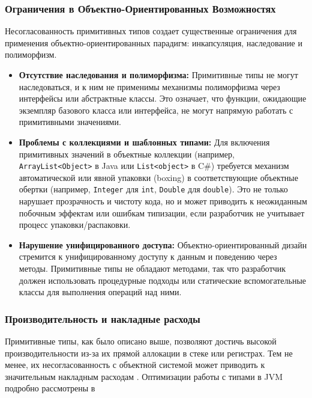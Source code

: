 \subsubsection*{Ограничения в Объектно-Ориентированных Возможностях}
Несогласованность примитивных типов создает существенные ограничения для применения объектно-ориентированных парадигм: инкапсуляция, наследование и полиморфизм.

\begin{itemize}
    \item \textbf{Отсутствие наследования и полиморфизма:} Примитивные типы не могут наследоваться, и к ним не применимы механизмы полиморфизма через интерфейсы или абстрактные классы. Это означает, что функции, ожидающие экземпляр базового класса или интерфейса, не могут напрямую работать с примитивными значениями.

    \item \textbf{Проблемы с коллекциями и шаблонных типами:} Для включения примитивных значений в объектные коллекции (например, \texttt{ArrayList<Object>} в Java или \texttt{List<object>} в C\#) требуется механизм автоматической или явной упаковки (boxing) в соответствующие объектные обертки (например, \texttt{Integer} для \texttt{int}, \texttt{Double} для \texttt{double}). Это не только нарушает прозрачность и чистоту кода, но и может приводить к неожиданным побочным эффектам или ошибкам типизации, если разработчик не учитывает процесс упаковки/распаковки.

    \item \textbf{Нарушение унифицированного доступа:} Объектно-ориентированный дизайн стремится к унифицированному доступу к данным и поведению через методы. Примитивные типы не обладают методами, так что разработчик должен использовать процедурные подходы или статические вспомогательные классы для выполнения операций над ними.
\end{itemize}

\subsubsection*{Производительность и накладные расходы}
\label{sec:performance}

Примитивные типы, как было описано выше, позволяют достичь высокой производительности из-за их прямой аллокации в стеке или регистрах. Тем не менее, их несогласованность с объектной системой может приводить к значительным накладным расходам \cite{chen2019}. Оптимизации работы с типами в JVM подробно рассмотрены в \cite{goetz2006}

